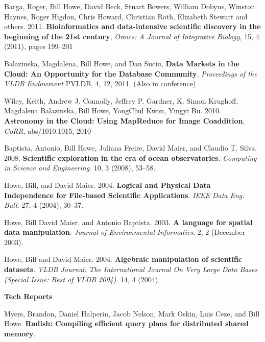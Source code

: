 \begin{bulletlist}
\item Barga, Roger, Bill Howe, David Beck, Stuart Bowers, William Dobyns, Winston Haynes, 
Roger Higdon, Chris Howard, Christian Roth, Elizabeth Stewart and others. 2011.
\textbf{Bioinformatics and data-intensive scientific discovery in the beginning of the 21st century},
\emph{Omics: A Journal of Integrative Biology}, 15, 4 (2011), pages 199--201

\item Balazinska, Magdalena, Bill Howe, and Dan Suciu,
\textbf{Data Markets in the Cloud: An Opportunity for the Database Community},
\emph{Proceedings of the VLDB Endowment} PVLDB, 4, 12, 2011. (Also in conference)

\item Wiley, Keith, Andrew J. Connolly, Jeffrey P. Gardner,
               K. Simon Krughoff, Magdalena Balazinska,
               Bill Howe, YongChul Kwon, Yingyi Bu. 2010.
\textbf{Astronomy in the Cloud: Using MapReduce for Image Coaddition},
\emph{CoRR}, abs/1010.1015, 2010

\item Baptista, Antonio, Bill Howe, Juliana Freire, David Maier, 
and Claudio T. Silva. 2008.
\textbf{Scientific exploration in the era of ocean observatories}.
\emph{Computing in Science and Engineering}. 10, 3 (2008), 53--58.

\item Howe, Bill, and David Maier. 2004. \textbf{Logical and Physical Data Independence for
File-based Scientific Applications}. \emph{IEEE Data Eng. Bull.} 27, 4
(2004), 30--37. 

\item Howe, Bill David Maier, and Antonio Baptista. 2003. 
\textbf{A language for spatial data manipulation}.
\emph{Journal of Environmental Informatics}. 2, 2 (December 2003).

\item Howe, Bill and David Maier. 2004. 
\textbf{Algebraic manipulation of scientific datasets}. \emph{VLDB Journal:
The International Journal On Very Large Data Bases (Special Issue: Best of VLDB 2004)}. 14, 4 (2004). 

\end{bulletlist}

{\bf Tech Reports}

\item Myers, Brandon, Daniel Halperin, Jacob Nelson, Mark Oskin, Luis Ceze, and Bill Howe.
\textbf{Radish: Compiling efficient query plans for distributed shared memory}.

